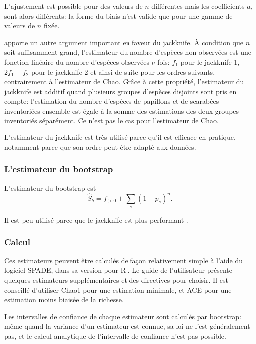 \documentclass[
  11pt,
  american,
  a4paper,
  extrafontsizes,onecolumn,openright
  ]{memoir}
\newlength{\rf}
\begin{document}
\normalsize

L'ajustement est possible pour des valeurs de \(n\) différentes mais les coefficients \(a_i\) sont alors différents: la forme du biais n'est valide que pour une gamme de valeurs de \(n\) fixée.

\textcite{Beguinot2016} apporte un autre argument important en faveur du jackknife.
À condition que \(n\) soit suffisamment grand, l'estimateur du nombre d'espèces non observées est une fonction linéaire du nombre d'espèces observées \(\nu\) fois: \(f_1\) pour le jackknife 1, \(2 f_1 - f_2\) pour le jackknife 2 et ainsi de suite pour les ordres suivants, contrairement à l'estimateur de Chao.
Grâce à cette propriété, l'estimateur du jackknife est additif quand plusieurs groupes d'espèces disjoints sont pris en compte: l'estimation du nombre d'espèces de papillons et de scarabées inventoriées ensemble est égale à la somme des estimations des deux groupes inventoriés séparément.
Ce n'est pas le cas pour l'estimateur de Chao.

L'estimateur du jackknife est très utilisé parce qu'il est efficace en pratique, notamment parce que son ordre peut être adapté aux données.

\subsubsection{L'estimateur du bootstrap}\label{lestimateur-du-bootstrap}

L'estimateur du bootstrap \autocite{Smith1984} est
\begin{equation} 
  \label{eq:Smith1984}
  \hat{S}_\mathit{b} = {f_{>0}} + \sum_s{(1 - p_s)^n}.
\end{equation}

Il est peu utilisé parce que le jackknife est plus performant \autocite{Colwell1994}.

\subsubsection{Calcul}\label{calcul}

Ces estimateurs peuvent être calculés de façon relativement simple à l'aide du logiciel SPADE, dans sa version pour R \autocite{Chao2016c}.
Le guide de l'utilisateur présente quelques estimateurs supplémentaires et des directives pour choisir.
Il est conseillé d'utiliser Chao1 pour une estimation minimale, et ACE pour une estimation moins biaisée de la richesse.

Les intervalles de confiance de chaque estimateur sont calculés par bootstrap: même quand la variance d'un estimateur est connue, sa loi ne l'est généralement pas, et le calcul analytique de l'intervalle de confiance n'est pas possible.
\end{document}
